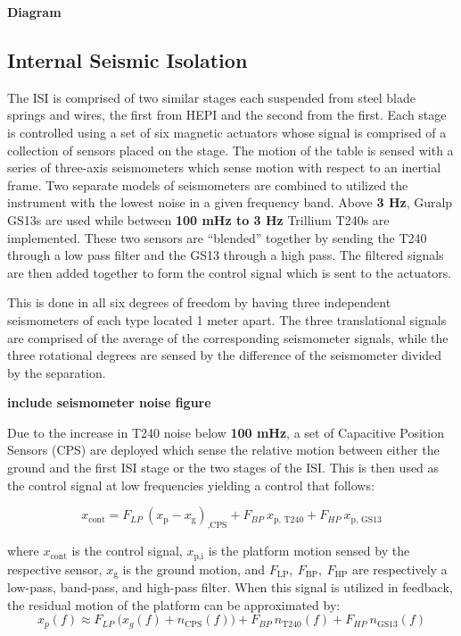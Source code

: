 \documentclass [12pt, proquest]{uwthesis}[2019]
\begin{document}
\textbf{Diagram}

\subsection{Internal Seismic Isolation}

The ISI is comprised of two similar stages each suspended from steel blade springs and wires, the first from HEPI and the second from the first. Each stage is controlled using a set of six magnetic actuators whose signal is comprised of a collection of sensors placed on the stage. The motion of the table is sensed with a series of three-axis seismometers which sense motion with respect to an inertial frame. Two separate models of seismometers are combined to utilized the instrument with the lowest noise in a given frequency band. Above \textbf{3 Hz}, Guralp GS13s are used while between \textbf{100 mHz to 3 Hz} Trillium T240s are implemented. These two sensors are ``blended'' together by sending the T240 through a low pass filter and the GS13 through a high pass. The filtered signals are then added together to form the control signal which is sent to the actuators. 

This is done in all six degrees of freedom by having three independent seismometers of each type located 1 meter apart. The three translational signals are comprised of the average of the corresponding seismometer signals, while the three rotational degrees are sensed by the difference of the seismometer divided by the separation.

\textbf{include seismometer noise figure}

Due to the increase in T240 noise below \textbf{100 mHz}, a set of Capacitive Position Sensors (CPS) are deployed which sense the relative motion between either the ground and the first ISI stage or the two stages of the ISI. This is then used as the control signal at low frequencies yielding a control that follows:

\begin{equation}
x_\text{cont}=F_{LP}\ (x_\text{p}-x_\text{g})_\text{,CPS}+F_{BP}\ x_\text{p, T240}+F_{HP}\ x_\text{p, GS13}
\end{equation}

where $x_\text{cont}$ is the control signal, $x_\text{p,i}$ is the platform motion sensed by the respective sensor, $x_\text{g}$ is the ground motion, and $F_\text{LP},\  F_\text{BP},\ F_\text{HP}$ are respectively a low-pass, band-pass, and high-pass filter. When this signal is utilized in feedback, the residual motion of the platform can be approximated by:
\begin{equation}
x_p(f)\approx F_{LP}\ \big(x_g(f)+n_\text{CPS}(f)\big)+F_{BP}\ n_\text{T240}(f)+F_{HP}\ n_\text{GS13}(f)
\end{equation}
\end{document}
